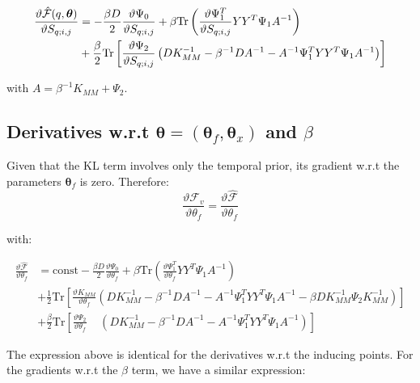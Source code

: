\documentclass{article} %
\begin{document}
\begin{align}
 \frac{\vartheta \hat{\mathcal{F}}(q, \boldsymbol \theta)}{\vartheta S_{q;i,j}}
{}& = - \frac{\beta D}{2} \frac{\vartheta \Psi_0}{\vartheta S_{q;i,j}}
    + \beta \text{Tr} \left(\frac{\vartheta \Psi_1^T}{\vartheta S_{q;i,j}} Y Y^T \Psi_1 A^{-1} \right) \nonumber \\
{}& + \frac{\beta}{2} \text{Tr} \left[ \frac{\vartheta \Psi_2}{\vartheta S_{q;i,j}}
       \left(
	  D K_{MM}^{-1} - \beta^{-1} D A^{-1} - A^{-1} \Psi_1^T Y Y^T \Psi_1 A^{-1}
       \right) \right] \label{derivFTildeEfficientComputationS}
\end{align}


with $A=\beta^{-1}K_{MM}+\Psi_2$.





\subsection{Derivatives w.r.t $\boldsymbol \theta = (\boldsymbol \theta_f, \boldsymbol \theta_x)$ and $\beta$}
Given that the KL term involves only the temporal prior, its gradient w.r.t the parameters $\boldsymbol \theta_f$ is zero. Therefore:
\begin{equation}
   \label{DerivativeOfFComplete}
      \frac{\vartheta \mathcal{F}_v}{\vartheta \theta_f} = \frac{\vartheta \hat{\mathcal{F}}}{\vartheta \theta_f}
\end{equation}

  with:

\begin{align}
\frac{\vartheta \hat{\mathcal{F}}}{\vartheta \theta_f} {}& = \text{const} - 
\frac{\beta D}{2} \frac{\vartheta \Psi_0}{\vartheta \theta_f}
 + \beta \text{Tr} \left(\frac{\vartheta \Psi_1^T}{\vartheta \theta_f} Y Y^T \Psi_1 A^{-1} \right) \nonumber \\
{}& + \frac{1}{2} \text{Tr} \left[ \frac{\vartheta K_{MM}}{\vartheta \theta_f}
        \left(
	   D K_{MM}^{-1} - \beta^{-1} D A^{-1} - A^{-1} \Psi_1^T Y Y^T \Psi_1 A^{-1} - \beta D K_{MM}^{-1} \Psi_2 K_{MM}^{-1} 
         \right) \right] \nonumber \\
{}& + \frac{\beta}{2} \text{Tr} \left[ \frac{\vartheta \Psi_2}{\vartheta \theta_f} \;\;\;\;
       \left(
	  D K_{MM}^{-1} - \beta^{-1} D A^{-1} - A^{-1} \Psi_1^T Y Y^T \Psi_1 A^{-1}
       \right) \right] \label{DerivativeOfFtildeComplete}
\end{align}

The expression above is identical for the derivatives w.r.t the inducing points.
For the gradients w.r.t the $\beta$ term, we have a similar expression:
\end{document}
